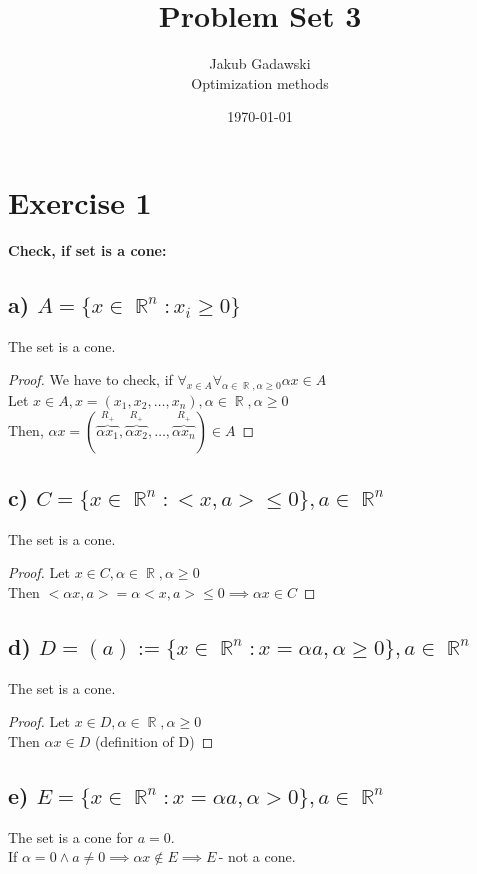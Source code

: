 \documentclass[12pt]{article}
\title{Problem Set 3}
\author{Jakub Gadawski\\ 
Optimization methods
}
\date{\today}
\DeclareMathOperator{\R}{\mathbb{R}}
\begin{document}
\setlength{\droptitle}{-5em}
\maketitle

\section*{Exercise 1}
{\bfseries Check, if set is a cone:}
\subsection*{a) \(A=\{x \in \R^n : x_i \geq 0\} \)}
The set is a cone.
\begin{proof}
    We have to check, if \(\forall_{x\in A}\forall_{\alpha \in \R, \alpha \geq 0} \alpha x \in A\)\\
    Let \(x\in A, x=(x_1, x_2, \ldots, x_n), \alpha \in \R, \alpha \geq 0\)\\
    Then, \( \alpha x = (\overbrace{\alpha x_1}^{R_+}, \overbrace{\alpha x_2}^{R_+}, \ldots, \overbrace{\alpha x_n}^{R_+}) \in A \)
\end{proof}
\subsection*{c) \( C=\{ x \in \R^n:<x, a> \leq 0\}, a\in \R^n\)}
The set is a cone.
\begin{proof}
    Let \( x \in C, \alpha \in \R, \alpha \geq 0\)\\
    Then \( <\alpha x, a>=\alpha <x, a> \leq 0 \implies \alpha x \in C \)
\end{proof}
\subsection*{d) \(D=(a):=\{x \in \R^n : x=\alpha a, \alpha \geq 0\}, a \in \R^n\) }
The set is a cone.
\begin{proof}
    Let \( x \in D, \alpha \in \R, \alpha \geq 0 \)\\
    Then \(\alpha x \in D\) (definition of D)
\end{proof}
\subsection*{e) \(E=\{x \in \R^n : x=\alpha a, \alpha > 0\}, a \in \R^n\) }
The set is a cone for \(a=0\).\\
If \(\alpha = 0 \land a \ne 0 \implies \alpha x \notin E \implies E\,\)- not a cone.
\end{document}
